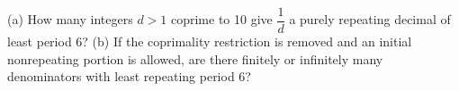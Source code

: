 (a) How many integers $ d>1 $ coprime to 10 give $\dfrac{1}{d}$ a purely repeating decimal of least period 6? (b) If the coprimality restriction is removed and an initial nonrepeating portion is allowed, are there finitely or infinitely many denominators with least repeating period 6?
